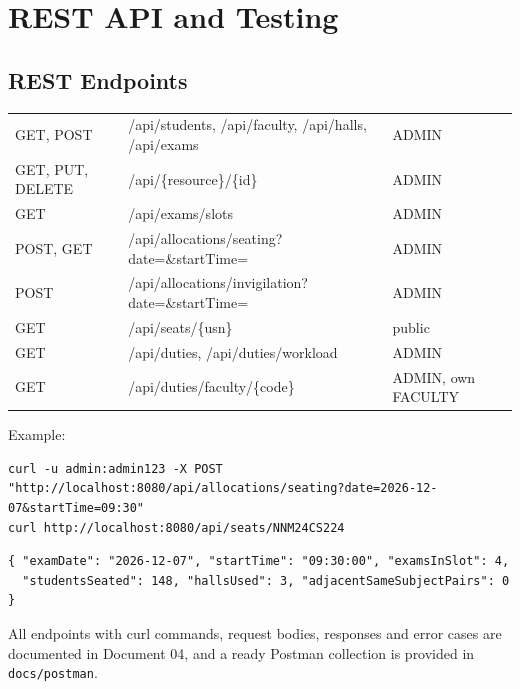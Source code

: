 \documentclass[12pt,a4paper,oneside]{report}
\begin{document}
\chapter{REST API and Testing}
\section{REST Endpoints}
\begin{tabularx}{\linewidth}{|L{2.6cm}|X|L{2.8cm}|}
\hline\headrow{} &  & \\\hline
GET, POST & /api/students, /api/faculty, /api/halls, /api/exams & ADMIN\\\hline
GET, PUT, DELETE & /api/\{resource\}/\{id\} & ADMIN\\\hline
GET & /api/exams/slots & ADMIN\\\hline
POST, GET & /api/allocations/seating?date=\&startTime= & ADMIN\\\hline
POST & /api/allocations/invigilation?date=\&startTime= & ADMIN\\\hline
GET & /api/seats/\{usn\} & public\\\hline
GET & /api/duties, /api/duties/workload & ADMIN\\\hline
GET & /api/duties/faculty/\{code\} & ADMIN, own FACULTY\\\hline
\end{tabularx}

\noindent Example:
\begin{lstlisting}[style=bash]
curl -u admin:admin123 -X POST "http://localhost:8080/api/allocations/seating?date=2026-12-07&startTime=09:30"
curl http://localhost:8080/api/seats/NNM24CS224
\end{lstlisting}
\begin{lstlisting}[style=json]
{ "examDate": "2026-12-07", "startTime": "09:30:00", "examsInSlot": 4,
  "studentsSeated": 148, "hallsUsed": 3, "adjacentSameSubjectPairs": 0 }
\end{lstlisting}
All endpoints with curl commands, request bodies, responses and error cases are documented in Document 04, and a ready Postman collection is provided in \texttt{docs/postman}.
\end{document}
